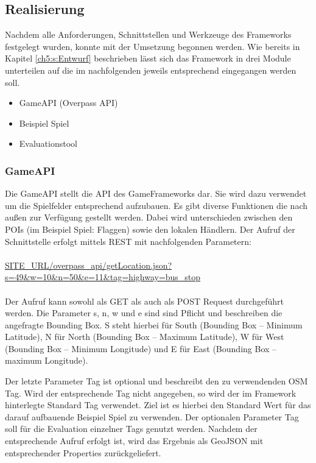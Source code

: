 \subsection*{Realisierung}

Nachdem alle Anforderungen, Schnittstellen und Werkzeuge des Frameworks festgelegt wurden, konnte mit der Umsetzung begonnen werden.
Wie bereits in Kapitel \ref{ch5:s:Entwurf} beschrieben lässt sich das Framework in drei Module unterteilen auf die im nachfolgenden jeweils entsprechend eingegangen werden soll.

\begin{itemize}

\item GameAPI (Overpass API)
\item Beispiel Spiel
\item Evaluationstool

\end{itemize}

\subsubsection*{GameAPI}

Die GameAPI stellt die API des GameFrameworks dar. Sie wird dazu verwendet um die Spielfelder entsprechend aufzubauen.
Es gibt diverse Funktionen die nach außen zur Verfügung gestellt werden.
Dabei wird unterschieden zwischen den POIs (im Beispiel Spiel: Flaggen) sowie den lokalen Händlern.
Der Aufruf der Schnittstelle erfolgt mittels REST mit nachfolgenden Parametern:
\\\\
\url{SITE\_URL/overpass\_api/getLocation.json?s=49&w=10&n=50&e=11&tag=highway=bus\_stop}
\\\\
Der Aufruf kann sowohl als GET als auch als POST Request durchgeführt werden. Die Parameter s, n, w und e sind sind Pflicht und beschreiben die angefragte Bounding Box.
S steht hierbei für South (Bounding Box -- Minimum Latitude), N für North (Bounding Box -- Maximum Latitude), W für West (Bounding Box -- Minimum Longitude) und E für East (Bounding Box -- maximum Longitude).

Der letzte Parameter Tag ist optional und beschreibt den zu verwendenden OSM Tag. Wird der entsprechende Tag nicht angegeben, so wird der im Framework hinterlegte Standard Tag verwendet. Ziel ist es hierbei den Standard Wert für das darauf aufbauende Beispiel Spiel zu verwenden. Der optionalen Parameter Tag soll für die Evaluation einzelner Tags genutzt werden. Nachdem der entsprechende Aufruf erfolgt ist, wird das Ergebnis als GeoJSON mit entsprechender Properties zurückgeliefert.
\\\\ %

